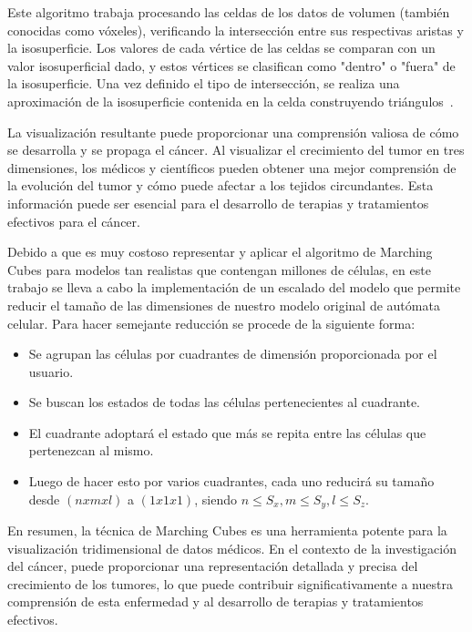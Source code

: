 Este algoritmo trabaja procesando las celdas de los datos de volumen (también conocidas como vóxeles), verificando la intersección entre sus respectivas aristas y la isosuperficie. Los valores de cada vértice de las celdas se comparan con un valor isosuperficial dado, y estos vértices se clasifican como "dentro"  o  "fuera" de la isosuperficie. Una vez definido el tipo de intersección, se realiza una aproximación de la isosuperficie contenida en la celda construyendo triángulos~\cite{1}.

La visualización resultante puede proporcionar una comprensión valiosa de cómo se desarrolla y se propaga el cáncer. Al visualizar el crecimiento del tumor en tres dimensiones, los médicos y científicos pueden obtener una mejor comprensión de la evolución del tumor y cómo puede afectar a los tejidos circundantes. Esta información puede ser esencial para el desarrollo de terapias y tratamientos efectivos para el cáncer.

Debido a que es muy costoso representar y aplicar el algoritmo de Marching Cubes para modelos tan realistas que contengan millones de c\'elulas, en este trabajo se lleva a cabo la implementaci\'on de un escalado del modelo que permite reducir el tama\~no de las dimensiones de nuestro modelo original de aut\'omata celular. Para hacer semejante reducci\'on se procede de la siguiente forma:
\begin{itemize}
    \item Se agrupan las c\'elulas por cuadrantes de dimensi\'on proporcionada por el usuario.
    \item Se buscan los estados de todas las c\'elulas pertenecientes al cuadrante.
    \item El cuadrante adoptar\'a el estado que m\'as se repita entre las c\'elulas que pertenezcan al mismo.
    \item Luego de hacer esto por varios cuadrantes, cada uno reducir\'a su tama\~no desde $(n x m x l)$ a $(1 x 1 x 1)$, siendo $n \leq S_{x} ,m \leq S_{y},l \leq S_{z}$. 
\end{itemize}

En resumen, la técnica de Marching Cubes es una herramienta potente para la visualización tridimensional de datos médicos. En el contexto de la investigación del cáncer, puede proporcionar una representación detallada y precisa del crecimiento de los tumores, lo que puede contribuir significativamente a nuestra comprensión de esta enfermedad y al desarrollo de terapias y tratamientos efectivos.\\

